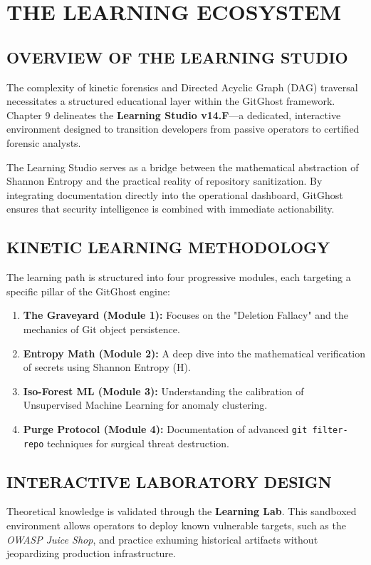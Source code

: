 \documentclass[12pt, a4paper, oneside]{report}
\begin{document}
\chapter{THE LEARNING ECOSYSTEM}

\section{OVERVIEW OF THE LEARNING STUDIO}
The complexity of kinetic forensics and Directed Acyclic Graph (DAG) traversal necessitates a structured educational layer within the GitGhost framework. Chapter 9 delineates the \textbf{Learning Studio v14.F}---a dedicated, interactive environment designed to transition developers from passive operators to certified forensic analysts. 

The Learning Studio serves as a bridge between the mathematical abstraction of Shannon Entropy and the practical reality of repository sanitization. By integrating documentation directly into the operational dashboard, GitGhost ensures that security intelligence is combined with immediate actionability.

\section{KINETIC LEARNING METHODOLOGY}
The learning path is structured into four progressive modules, each targeting a specific pillar of the GitGhost engine:

\begin{enumerate}
    \item \textbf{The Graveyard (Module 1):} Focuses on the "Deletion Fallacy" and the mechanics of Git object persistence.
    \item \textbf{Entropy Math (Module 2):} A deep dive into the mathematical verification of secrets using Shannon Entropy (H).
    \item \textbf{Iso-Forest ML (Module 3):} Understanding the calibration of Unsupervised Machine Learning for anomaly clustering.
    \item \textbf{Purge Protocol (Module 4):} Documentation of advanced \texttt{git filter-repo} techniques for surgical threat destruction.
\end{enumerate}

\section{INTERACTIVE LABORATORY DESIGN}
Theoretical knowledge is validated through the \textbf{Learning Lab}. This sandboxed environment allows operators to deploy known vulnerable targets, such as the \textit{OWASP Juice Shop}, and practice exhuming historical artifacts without jeopardizing production infrastructure.
\end{document}
